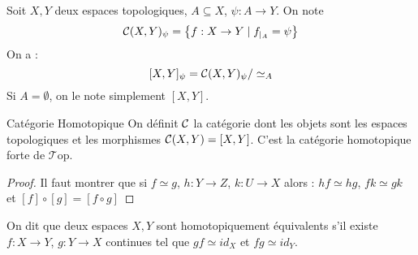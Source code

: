 \documentclass{cours}
\newcommand{\Top}{\mathcal{T}\mathrm{op}}
\begin{document}
\begin{définition}{}{}
    Soit $X, Y$ deux espaces topologiques, $A \subseteq X$, $\psi : A \to Y$. On note\[
        \mathcal{C}(X, Y)_{\psi} = \left\{f : X \to Y \mid f_{\mid_{A}} = \psi\right\}
    \]
    On a : 
    \[
        [X, Y]_{\psi} = \mathcal{C}(X, Y)_{\psi}/\simeq_{A}
    \]
    Si $A = \emptyset$, on le note simplement $[X, Y]$.
\end{définition}

\begin{propositionfr}{Catégorie Homotopique}{}
    On définit $\mathcal{C}$ la catégorie dont les objets sont les espaces topologiques et les morphismes $\mathcal{C}(X, Y) = [X, Y]$. C'est la catégorie homotopique forte de $\Top$.
\end{propositionfr}
\begin{proof}
    Il faut montrer que si $f\simeq g$, $h : Y \to Z$, $k : U \to X$ alors :     $hf \simeq hg$, $fk \simeq gk$ et $[f] \circ [g] = [f \circ g]$
\end{proof}

\begin{définition}{}{}
    On dit que deux espaces $X, Y$ sont homotopiquement équivalents s'il existe $f : X \to Y$, $g : Y \to X$ continues tel que $gf \simeq id_{X}$ et $fg \simeq id_{Y}$.    
\end{définition}
\end{document}
